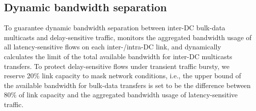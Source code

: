 %
%
%
%

\subsection{Dynamic bandwidth separation}
\label{subsec:system:separation}


To guarantee dynamic bandwidth separation between inter-DC
bulk-data multicasts and delay-sensitive traffic, \name
monitors the aggregated bandwidth usage of all
latency-sensitive flows on each inter-/intra-DC link, and dynamically
calculates the limit of the total available bandwidth for inter-DC multicasts transfers.
To protect delay-sensitive flows under transient traffic bursty,
we reserve 20\% link capacity to mask network conditions,
i.e., the upper bound of the available bandwidth for bulk-data
transfers is set to be the difference between 80\% of
link capacity and the aggregated bandwidth usage of
latency-sensitive traffic.


